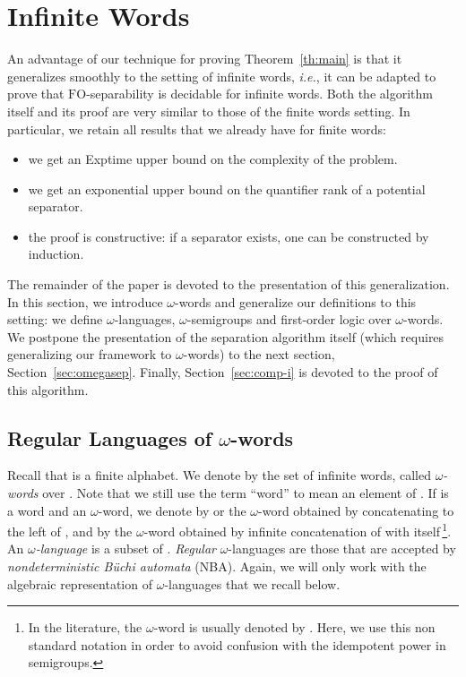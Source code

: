 \documentclass{CSML}
\newcommand{\fo}{\ensuremath{\text{FO}}\xspace}
\newcommand\iword{\ensuremath{\omega}-word\xspace}
\newcommand\ilang{\ensuremath{\omega}-language\xspace}
\newcommand\iwords{\ensuremath{\omega}-words\xspace}
\newcommand\ilangs{\ensuremath{\omega}-languages\xspace}
\newcommand\isemis{\ensuremath{\omega}-semigroups\xspace}
\theoremstyle{plain}
\begin{document}
\section{Infinite Words}
\label{sec:omega}
An advantage of our technique for proving Theorem~\ref{th:main} is
that it generalizes smoothly to the setting of infinite words, \emph{i.e.},
it can be adapted to prove that \fo-separability is decidable for
infinite words. Both the algorithm itself and its proof are very similar to
those of the finite words setting. In particular, we retain all
results that we already have for finite words:

\begin{itemize}
\item we get an {\sc Exptime} upper bound on the complexity of the
  problem.
\item we get an exponential upper bound on the quantifier rank of a
  potential separator.
\item the proof is constructive: if a separator exists, one can be
  constructed by induction.
\end{itemize}

The remainder of the paper is devoted to the presentation of this
generalization. In this section, we introduce \iwords and generalize
our definitions to this setting: we define \ilangs, \isemis and
first-order logic over \iwords. We postpone the presentation of the
separation algorithm itself (which requires generalizing our framework
to \iwords) to the next section, Section~\ref{sec:omegasep}. Finally,
Section~\ref{sec:comp-i} is devoted to the proof of this algorithm.

\subsection{\texorpdfstring{Regular Languages of \iwords}{Regular Languages of
    infinite words}}

\medskip
\noindent {\textbf{\iwords and \ilangs.}} Recall that  is a finite
alphabet. We denote by  the set of infinite words, called \emph{\iwords} over . Note
that we still use the term ``word'' to mean an element of . If
 is a word and  an \iword, we denote by  or  the \iword
obtained by concatenating  to the left of , and by  the
\iword obtained by infinite concatenation of  with
itself\,\footnote{In the literature, the \iword  is usually
  denoted by . Here, we use this non standard notation in
  order to avoid confusion with the idempotent power  in
  semigroups.}. An \emph{\ilang} is a subset of . \emph{Regular}
\ilangs are those that are accepted by \emph{nondeterministic Büchi
  automata} (NBA). Again, we will only work with the algebraic
representation of \ilangs that we recall below.
\end{document}
